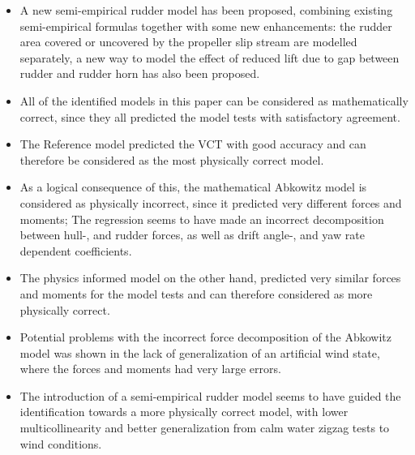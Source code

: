 \begin{itemize}
    \item A new semi-empirical rudder model has been proposed, combining existing semi-empirical formulas together with some new enhancements: the rudder area covered or uncovered by the propeller slip stream are modelled separately, a new way to model the effect of reduced lift due to gap between rudder and rudder horn has also been proposed.     

    \item All of the identified models in this paper can be considered as mathematically correct, since they all predicted the model tests with satisfactory agreement.
    
    \item The Reference model predicted the VCT with good accuracy and can therefore be considered as the most physically correct model.   
    \item As a logical consequence of this, the mathematical Abkowitz model is considered as physically incorrect, since it predicted very different forces and moments; The regression seems to have made an incorrect decomposition between hull-, and rudder forces, as well as drift angle-, and yaw rate dependent coefficients.  
    \item The physics informed model on the other hand, predicted very similar forces and moments for the model tests and can therefore considered as more physically correct.
    \item Potential problems with the incorrect force decomposition of the Abkowitz model was shown in the lack of generalization of an artificial wind state, where the forces and moments had very large errors. 
    \item The introduction of a semi-empirical rudder model seems to have guided the identification towards a more physically correct model, with lower multicollinearity and better generalization from calm water zigzag tests to wind conditions. 
\end{itemize}